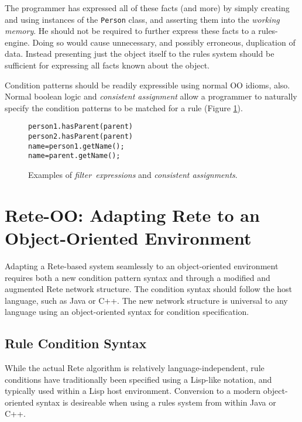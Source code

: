 \documentclass[10pt,twocolumn,letterpaper,colorhighlight]{article}
\newenvironment{codelisting}%
	{\begin{minipage}{250pt}\small\begin{alltt}}%
	{\end{alltt}\end{minipage}}
\begin{document}
The programmer has expressed all of these facts (and more) by simply creating and
using instances of the \verb|Person| class, and asserting them into
the \emph{working memory}. He should not be required
to further express these facts to a rules-engine.  Doing so would
cause unnecessary, and possibly erroneous, duplication of data.
Instead presenting just the object itself to the rules system should
be sufficient for expressing all facts known about the object.

Condition patterns should be readily expressible using normal OO
idioms, also.  Normal boolean logic and \emph{consistent assignment} 
allow a programmer to naturally specify the condition patterns to be
matched for a rule (Figure \ref{example.exprs}).

	\begin{figure}
	\begin{codelisting}
	person1.hasParent( parent )
	person2.hasParent( parent )
	name = person1.getName();
	name = parent.getName();
	\end{codelisting}

	\caption{Examples of \emph{filter~expressions} and \emph{consistent
	assignments}.}
	\label{example.exprs}
	\end{figure}


\section{Rete-OO: Adapting Rete to an\\Object-Oriented Environment}

Adapting a Rete-based system seamlessly to an object-oriented
environment requires both a new condition pattern syntax and through a
modified and augmented Rete network structure.  The condition syntax should
follow the host language, such as Java or C++. The new network
structure is universal to any language using an object-oriented syntax
for condition specification.

\subsection{Rule Condition Syntax}

While the actual Rete algorithm is relatively language-independent,
rule conditions have traditionally been specified using a Lisp-like
notation, and typically used within a Lisp host
environment. Conversion to a modern object-oriented syntax is
desireable when using a rules system from within Java or C++.
\end{document}
